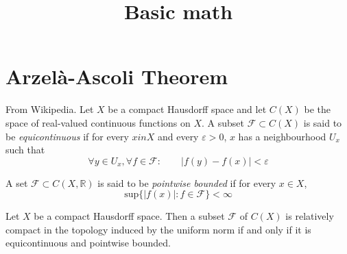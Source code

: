



\title{Basic math}
\maketitle

\label{section-phantom}

\tableofcontents

\section{Arzelà-Ascoli Theorem}
\label{section-Arzela-Ascoli-theorem}
\begin{definition}
\label{definition-equicontinuous}
From Wikipedia. Let $X$ be a compact Hausdorff space and let  $C(X)$ be the
space of real-valued continuous functions on $X$. A subset $\mathcal{F} \subset
C(X)$ is said to be {\it equicontinuous} if for every $x in X$ and every
$\varepsilon>0$, $x$ has a neighbourhood $U_x$ such that
$$
\forall y \in U_x, \forall f \in \mathcal{F}: \qquad |f(y)-f(x)|<\varepsilon
$$
\end{definition}

\begin{definition}
\label{definition-pointwise-bounded}
A set $\mathcal{F}\subset C(X,\mathbb{R})$ is said to be {\it pointwise
bounded} if for every $x \in X$,
$$
\text{sup}\{|f(x)|:f \in \mathcal{F}\}<\infty
$$
\end{definition}

\begin{theorem}
\label{theorem-Arzela-Ascoli}
Let $X$ be a compact Hausdorff space. Then a subset $\mathcal{F}$ of $C(X)$ is
relatively compact in the topology induced by the uniform norm if and only if it
is equicontinuous and pointwise bounded.
\end{theorem}






